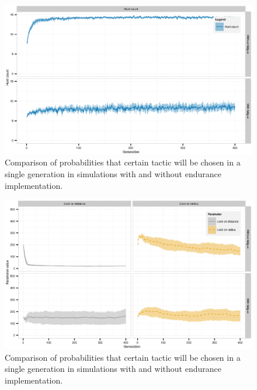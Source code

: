 \documentclass[internal]{FRIreport}
\begin{document}
\begin{figure}[H]
\centering
\includegraphics[scale=0.75]{dispersehuntcount.eps}
\caption{Comparison of probabilities that certain tactic will be chosen in a single generation in simulations with and without endurance implementation.}
\label{ref:results5}
\end{figure} \hfill 
\begin{figure}[H]
\centering
\includegraphics[scale=0.75]{disperse_graph.eps}
\caption{Comparison of probabilities that certain tactic will be chosen in a single generation in simulations with and without endurance implementation.}
\label{ref:results6}
\end{figure} \hfill 
\end{document}
